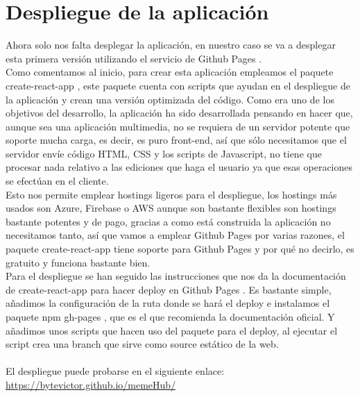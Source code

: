 \newpage
\section{Despliegue de la aplicación}

Ahora solo nos falta desplegar la aplicación, en nuestro caso se va a desplegar esta primera 
versión utilizando el servicio de Github Pages \cite{GithubPages}.
\\
Como comentamos al inicio, para crear esta aplicación empleamos el paquete create-react-app \cite{create-react-app},
este paquete cuenta con scripts que ayudan en el despliegue de la aplicación y crean una 
versión optimizada del código.
Como era uno de los objetivos del desarrollo, la aplicación ha sido desarrollada pensando
en hacer que, aunque sea una aplicación multimedia, no se requiera de un servidor potente que
soporte mucha carga, es decir, es puro front-end, así que sólo necesitamos que el servidor
envíe código HTML, CSS y los scripts de Javascript, no tiene que procesar nada relativo a las
ediciones que haga el usuario ya que esas operaciones se efectúan en el cliente.
\\
Esto nos permite emplear hostings ligeros para el despliegue, 
los hostings más usados son Azure, Firebase o AWS aunque son bastante flexibles son hostings 
bastante potentes y de pago, gracias a como está construida la aplicación no necesitamos tanto,
así que vamos a emplear Github Pages por varias razones, el paquete 
create-react-app \cite{create-react-app} tiene soporte para Github Pages \cite{GithubPages}
y por qué no decirlo, es gratuito y funciona bastante bien.
\\
Para el despliegue se han seguido las instrucciones que nos da la documentación de 
create-react-app para hacer deploy en Github Pages \cite{GithubPagesDeploy}.
Es bastante simple, añadimos la configuración de la ruta donde se hará el deploy e instalamos
el paquete npm gh-pages \cite{gh-pages}, que es el que recomienda la documentación oficial.
Y añadimos unos scripts que hacen uso del paquete para el deploy, al ejecutar el script
crea una branch que sirve como source estático de la web.
\\\\
El despliegue puede probarse en el siguiente enlace: \url{https://bytevictor.github.io/memeHub/}